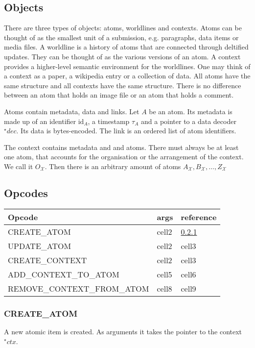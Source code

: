 \documentclass[14pt]{article}
\begin{document}
\subsection{Objects}
There are three types of objects: atoms, worldlines and contexts. 
Atoms can be thought of as the smallest unit of a submission, e.g. paragraphs, data items or media files. A worldline is a history of atoms that are connected through deltified updates. They can be thought of as the various versions of an atom. A context provides a higher-level semantic environment for the worldlines. One may think of a context as a paper, a wikipedia entry or a collection of data. All atoms have the same structure and all contexts have the same structure. There is no difference between an atom that holds an image file or an atom that holds a comment.  

Atoms contain metadata, data and links. Let $A$ be an atom. Its metadata is made up of an identifier $\textrm{id}_A$, a timestamp $\tau_A$ and a pointer to a data decoder ${}^{\star}\!dec$. Its data is bytes-encoded. The link is an ordered list of atom identifiers.

The context contains metadata and and atoms. There must always be at least one atom, that accounts for the organisation or the arrangement of the context. We call it $O_{\mathcal X}$. Then there is an arbitrary amount of atoms $A_{\mathcal X}, B_{\mathcal X}, \dots , Z_{\mathcal X}$

\subsection{Opcodes}

\begin{center}
\begin{tabular}{ | m{19em} | m{6em}| m{6em} | } 
  \hline
  \textbf{Opcode} & \textbf{args} & \textbf{reference} \\
\hline
  \hline
  CREATE\_ATOM & cell2 & \ref{sssc:CREATE_ATOM} \\ 
  \hline
  UPDATE\_ATOM & cell2 & cell3 \\ 
  \hline
  \hline
  CREATE\_CONTEXT & cell2 & cell3 \\ 
  \hline
  ADD\_CONTEXT\_TO\_ATOM & cell5 & cell6 \\ 
  \hline
REMOVE\_CONTEXT\_FROM\_ATOM & cell8 & cell9 \\ 
  \hline
  \hline
\end{tabular}
\end{center}


\subsubsection{CREATE\_ATOM}
\label{sssc:CREATE_ATOM}
A new atomic item is created. As arguments it takes the pointer to the context ${}^\star\!ctx$.



\end{document}
